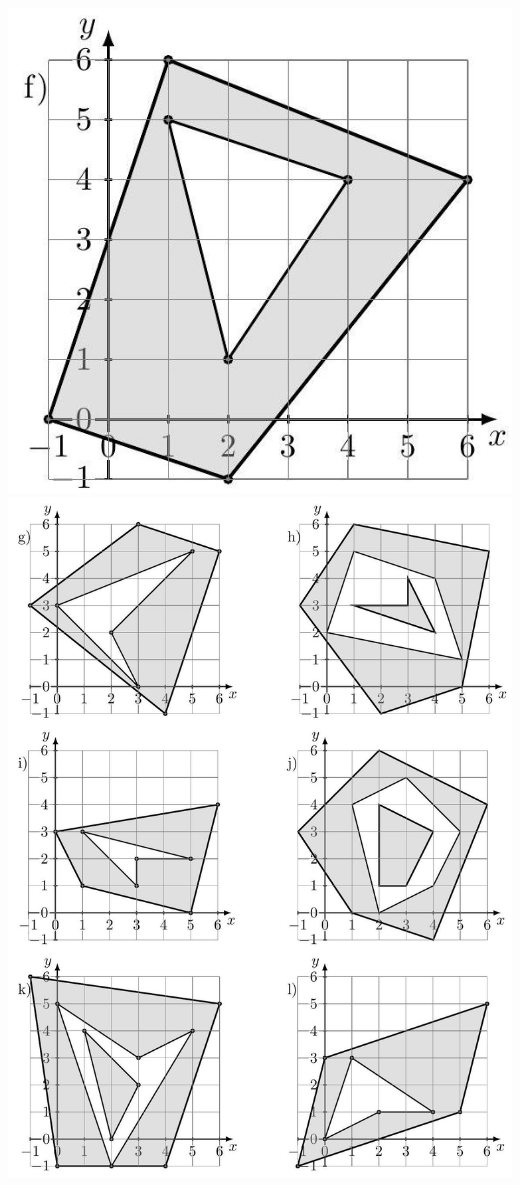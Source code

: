 \documentclass[10pt]{article}
\begin{document}
\includegraphics[max width=\textwidth, center]{2024_11_21_8f01584889ff06348ae7g-209(2)}\\
\includegraphics[max width=\textwidth, center]{2024_11_21_8f01584889ff06348ae7g-210}
\end{document}

